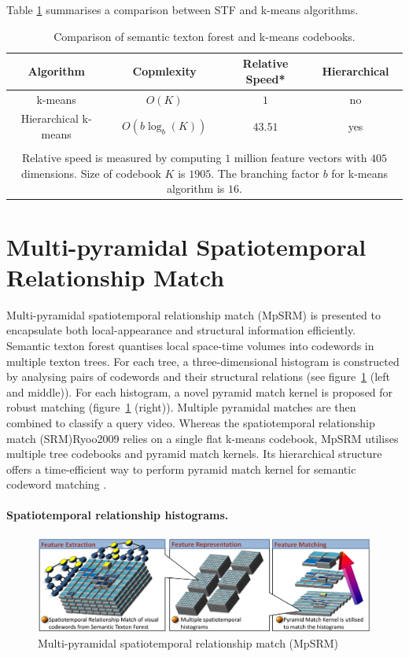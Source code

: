 Table \ref{tab/act/codebook} summarises a comparison between STF and k-means algorithms.
\begin{table}
\begin{center}
{\footnotesize
\begin{tabular}{|c|c|c|c|}
\hline
\textbf{ Algorithm} & \textbf{ Copmlexity} & \textbf{ Relative Speed}* & \textbf{ Hierarchical} \\
\hline
\hline
k-means & $O(K)$ & $1$ & no \\
Hierarchical k-means & $O(b\log_{b}(K))$ & $43.51$ & yes \\
{\color{blue}{STF}} & {\color{blue}{ $ O(\log_{2}(K)) $ }} & {\color{blue}{$559.86$}} & {\color{blue}{yes}}\\
\hline
\multicolumn{4}{p{0.75\linewidth}}{\scriptsize Relative speed is measured by computing $1$ million feature vectors with $405$ dimensions. Size of codebook $K$ is $1905$. The branching factor $b$ for k-means algorithm is $16$.}
\end{tabular}
}
\end{center}
\caption{Comparison of semantic texton forest and k-means codebooks.}
\label{tab/act/codebook}
\end{table}

\section{Multi-pyramidal Spatiotemporal Relationship Match}
\label{sec/act/MpSRM}
Multi-pyramidal spatiotemporal relationship match (MpSRM) is presented to encapsulate both local-appearance and structural information efficiently. Semantic texton forest quantises local space-time volumes into codewords in multiple texton trees. For each tree, a three-dimensional histogram is constructed by analysing pairs of codewords and their structural relations (see figure~\ref{fig/act/mpsrm} (left and middle)). For each histogram, a novel pyramid match kernel is proposed for robust matching (figure~\ref{fig/act/mpsrm} (right)). Multiple pyramidal matches are then combined to classify a query video. Whereas the spatiotemporal relationship match (SRM){Ryoo2009} relies on a single flat k-means codebook, MpSRM utilises multiple tree codebooks and pyramid match kernels. Its hierarchical structure offers a time-efficient way to perform pyramid match kernel for semantic codeword matching \cite{Grauman2005}.
\paragraph{Spatiotemporal relationship histograms.}
\begin{figure}[ht]
\includegraphics[width=1\linewidth]{fig/act/fig4.pdf}%
\caption{Multi-pyramidal spatiotemporal relationship match (MpSRM)}
\label{fig/act/mpsrm}
\end{figure}


